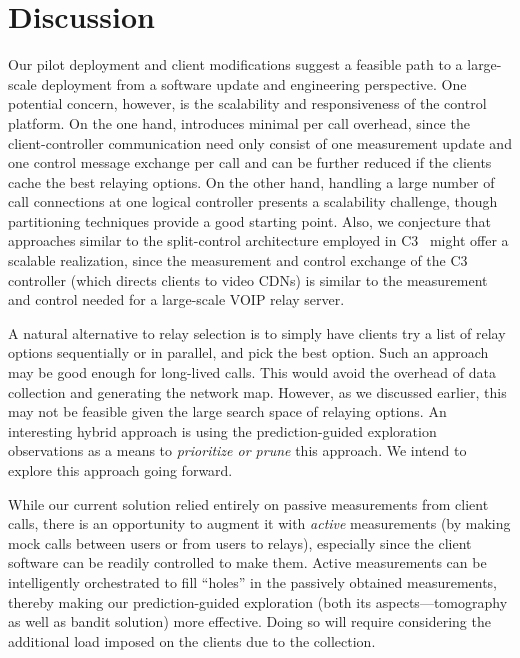 \section{Discussion}
\label{sec:via:discussion}

 Our pilot deployment and client modifications suggest a feasible path to a large-scale deployment from a software update and engineering perspective. One potential concern, however, is the scalability and responsiveness of the control platform. On the one hand, {\hybrid} introduces minimal per call overhead, since the client-controller communication need only consist of one measurement update and one control message exchange per call and can be further reduced if the clients cache the best relaying options. %
On the other hand, handling a large number of call connections at one logical controller presents a scalability challenge, though partitioning techniques provide a good starting point. Also, we conjecture that approaches similar to the split-control architecture employed in C3~\cite{c3} might offer a scalable realization, since the measurement and control exchange of the C3 controller (which directs clients to video CDNs) is similar to the measurement and control needed for a large-scale VOIP relay server. 


 A natural alternative to relay selection is to simply have clients try a list of relay options sequentially or in parallel, and pick the best option. Such an approach may be good enough for long-lived calls. This would avoid the overhead of data collection and generating the network map. However, as we discussed earlier, this may not be feasible given the large search space of relaying options. An interesting hybrid approach is using the prediction-guided exploration observations as a means to {\em prioritize or prune} this approach. We intend to explore this approach going forward.

 While our current solution relied entirely on passive measurements from client calls, there is an opportunity to augment it with {\em active} measurements (by making mock calls between users or from users to relays), especially since the client software can be readily controlled to make them. Active measurements can be intelligently orchestrated to fill ``holes'' in the passively obtained measurements, thereby making our prediction-guided exploration (both its aspects---tomography as well as bandit solution) more effective. Doing so will require considering the additional load imposed on the clients due to the collection. 








